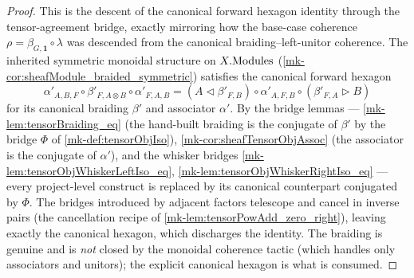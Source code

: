 \begin{proof}
  \leanok
  This is the descent of the canonical forward hexagon identity
  through the tensor-agreement bridge, exactly mirroring how the
  base-case coherence \(\rho = \beta_{G,\mathbf{1}}\circ\lambda\) was descended
  from the canonical braiding--left-unitor coherence. The inherited symmetric
  monoidal structure on \(X.\mathrm{Modules}\) (\ref{mk-cor:sheafModule_braided_symmetric})
  satisfies the canonical forward hexagon
  \[
    \alpha'_{A,B,F}\circ\beta'_{F,A\otimes B}\circ\alpha'_{F,A,B}
    = (A\lhd\beta'_{F,B})\circ\alpha'_{A,F,B}\circ(\beta'_{F,A}\rhd B)
  \]
  for its canonical braiding \(\beta'\) and associator \(\alpha'\). By the bridge
  lemmas --- \ref{mk-lem:tensorBraiding_eq} (the hand-built braiding is the
  conjugate of \(\beta'\) by the bridge \(\Phi\) of \ref{mk-def:tensorObjIso}),
  \ref{mk-cor:sheafTensorObjAssoc} (the associator is the conjugate of \(\alpha'\)),
  and the whisker bridges \ref{mk-lem:tensorObjWhiskerLeftIso_eq},
  \ref{mk-lem:tensorObjWhiskerRightIso_eq} --- every project-level construct is
  replaced by its canonical counterpart conjugated by \(\Phi\). The bridges
  introduced by adjacent factors telescope and cancel in inverse pairs (the
  cancellation recipe of \ref{mk-lem:tensorPowAdd_zero_right}), leaving exactly the
  canonical hexagon, which discharges the identity. The braiding is genuine and is
  \emph{not} closed by the \(\mathrm{monoidal}\) coherence tactic (which handles
  only associators and unitors); the explicit canonical hexagon is what is
  consumed.
\end{proof}

